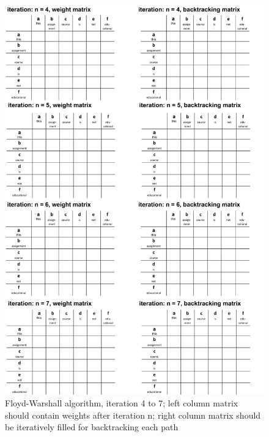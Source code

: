 \documentclass{article}
\begin{document}
    \begin{figure}[!h]
        \centering
        \includegraphics[width=1.0\textwidth]{./figures/wfst_charts_2.pdf}
        \caption{Floyd-Warshall algorithm, iteration 4 to 7; left column matrix should contain weights after iteration n; right column matrix should be iteratively filled for backtracking each path}
        \label{fig:wfst_charts_2}
    \end{figure} 
\end{document}
